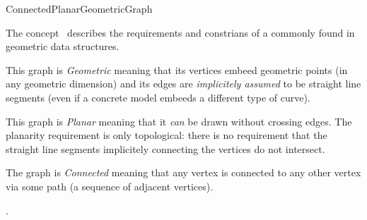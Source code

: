 
\begin{ccRefConcept}{ConnectedPlanarGeometricGraph}


\ccDefinition

The concept \ccRefName\ describes the requirements and constrians of a  commonly found in geometric data structures.

This graph is {\em Geometric} meaning that its vertices embeed geometric points (in any geometric dimension) and its edges are {\em implicitely assumed} to be straight line segments (even if a concrete model embeeds a different type of curve).

This graph is {\em Planar} meaning that it \textit{can} be drawn without crossing edges. The planarity requirement is only topological: there is no requirement that the straight line segments implicitely connecting the vertices do not intersect.

The graph is {\em Connected} meaning that any vertex is connected to any other vertex via some path (a sequence of adjacent vertices).

\ccRefines
{}

\ccTypes
\ccGlue    
\ccGlue    

\ccCreation
{}  %

\ccOperations
\ccGlue
  
\ccHasModels
{}.

\end{ccRefConcept}

